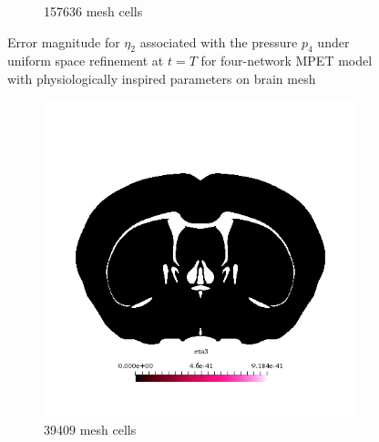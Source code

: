 \begin{figure}[h!]
\begin{subfigure}[b]{0.49\textwidth}
    \caption{157636 mesh cells}
  \end{subfigure}
  \caption{Error magnitude for $\eta_2$ associated with the pressure $p_4$ under uniform space refinement at $t=T$ for four-network MPET model with physiologically inspired parameters on brain mesh} \label{fig:mpet4_eta2_p4}
\end{figure}


\begin{figure}[h!]
  \centering
  \centering
    \begin{subfigure}[b]{0.49\textwidth}
    \includegraphics[width=\textwidth,height=\textheight,keepaspectratio,height=\textheight,keepaspectratio]{figures/4_mpet/biomedical/space/eta3_1.png}
    \caption{39409 mesh cells}
  \end{subfigure}
  \begin{subfigure}[b]{0.49\textwidth}

\end{subfigure}
\end{figure}
